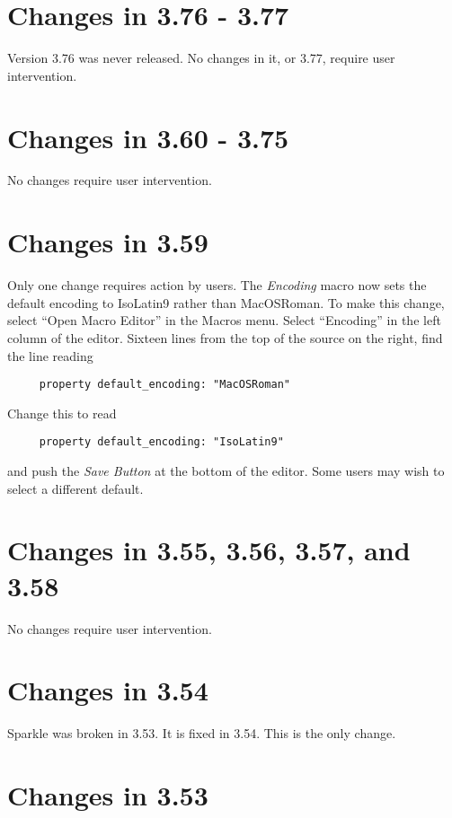 \documentclass[11pt, oneside]{amsart}
\begin{document}
\section{Changes in 3.76 - 3.77}

Version 3.76 was never released. No changes in it, or 3.77, require user intervention.


\section{Changes in 3.60 - 3.75}

No changes require user intervention.

\section{Changes in 3.59}

Only one change requires  action by users. The {\em Encoding} macro now sets the default encoding to IsoLatin9 rather than MacOSRoman. To make this change, 
select ``Open Macro Editor'' in the Macros menu. Select ``Encoding'' in the left column of the editor. Sixteen lines from the top of the source on the right, find the line reading
\begin{verbatim}
     property default_encoding: "MacOSRoman"
\end{verbatim}
Change this to read
\begin{verbatim}
     property default_encoding: "IsoLatin9"
\end{verbatim}
and push the {\em Save Button} at the bottom of the editor. Some users may wish to select a different default.


\section{Changes in 3.55, 3.56, 3.57, and 3.58}

No changes require user intervention.

\section{Changes in 3.54}

Sparkle was broken in 3.53. It is fixed in 3.54. This is the only change.

\section{Changes in 3.53}
\end{document}
